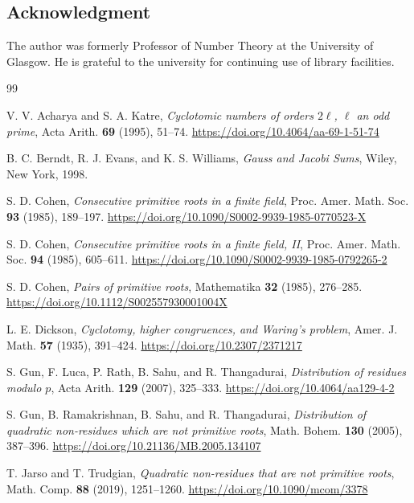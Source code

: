 \documentclass[12pt]{amsart}
\numberwithin{equation}{section}
\begin{document}
 
 
\bigskip
\subsection*{Acknowledgment}

The author was formerly Professor of Number Theory at the University of Glasgow.  He is grateful to the university for continuing use of library facilities.


\bigskip

\begin{thebibliography}{99}

V. V. Acharya and S. A. Katre, \emph{Cyclotomic numbers of orders $2\ell$, $\ell$ an odd prime}, Acta Arith. \textbf{69} (1995), 51--74. \url{https://doi.org/10.4064/aa-69-1-51-74}

B. C. Berndt, R. J. Evans, and K. S. Williams, \emph{Gauss and Jacobi Sums}, Wiley, New York, 1998.

S. D. Cohen, \emph{Consecutive primitive roots in a finite field}, Proc. Amer. Math. Soc. \textbf{93} (1985), 189--197. \url{https://doi.org/10.1090/S0002-9939-1985-0770523-X}

S. D. Cohen, \emph{Consecutive primitive roots in a finite field, II}, Proc. Amer. Math. Soc. \textbf{94} (1985), 605--611. \url{https://doi.org/10.1090/S0002-9939-1985-0792265-2}

S. D. Cohen, \emph{Pairs of primitive roots}, Mathematika \textbf{32} (1985), 276--285. \url{https://doi.org/10.1112/S002557930001004X}

L. E. Dickson, \emph{Cyclotomy, higher congruences, and Waring's problem}, Amer. J. Math. \textbf{57} (1935), 391--424. \url{https://doi.org/10.2307/2371217}

S. Gun, F. Luca, P. Rath, B. Sahu, and R. Thangadurai, \emph{Distribution of residues modulo $p$}, Acta Arith. \textbf{129} (2007), 325--333. \url{https://doi.org/10.4064/aa129-4-2}

S. Gun, B. Ramakrishnan, B. Sahu, and R. Thangadurai, \emph{Distribution of quadratic non-residues which are not primitive roots}, Math. Bohem. \textbf{130} (2005), 387--396. \url{https://doi.org/10.21136/MB.2005.134107}

T. Jarso and T. Trudgian, \emph{Quadratic non-residues that are not primitive roots}, Math. Comp. \textbf{88} (2019), 1251--1260. \url{https://doi.org/10.1090/mcom/3378}


\end{thebibliography}
\end{document}
